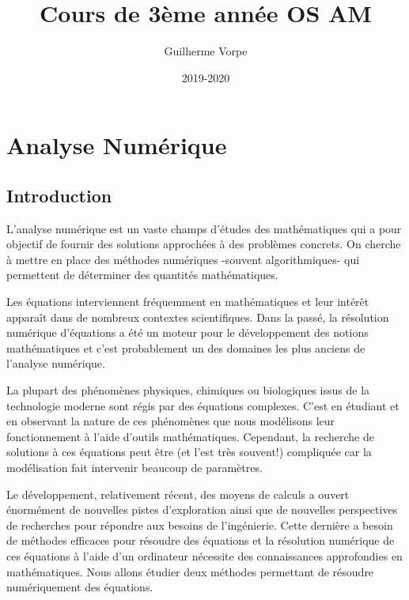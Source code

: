 \documentclass[11pt,a4paper,twoside,greek]{report}
\title{Cours de 3ème année OS AM}
\author{Guilherme Vorpe}
\date{2019-2020}
\begin{document}




\chapter{Analyse Numérique}
\thispagestyle{fancy}

\setcounter{section}{-1}
\section{Introduction}
L'analyse numérique est un vaste champs d'études des mathématiques qui a pour objectif de fournir des solutions approchées à des problèmes concrets. On cherche à mettre en place des méthodes numériques -souvent algorithmiques- qui permettent de déterminer des quantités mathématiques.%


\medskip Les équations interviennent fréquemment en mathématiques et leur intérêt apparaît dans de nombreux contextes scientifiques. Dans la passé, la résolution numérique d'équations a été un moteur pour le développement des notions  mathématiques et c'est probablement un des domaines les plus anciens de l'analyse numérique.

\medskip La plupart des phénomènes physiques, chimiques ou biologiques issus de la technologie moderne sont régis par des équations complexes. C'est en étudiant et en observant la nature de ces phénomènes que nous modélisons leur fonctionnement à l'aide d'outils mathématiques. Cependant, la recherche de solutions à ces équations peut être (et l'est très souvent!) compliquée car la modélisation fait intervenir beaucoup de paramètres.


\medskip Le développement, relativement récent, des moyens de calculs a ouvert énormément de nouvelles pistes d'exploration ainsi que de nouvelles perspectives de recherches pour répondre aux besoins de l'ingénierie. Cette dernière a besoin de méthodes efficaces pour résoudre des équations et  la résolution numérique de ces équations à l'aide d'un ordinateur nécessite des connaissances approfondies en mathématiques. Nous allons étudier deux méthodes permettant de résoudre numériquement des équations.
\end{document}
